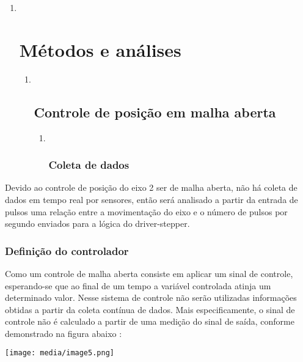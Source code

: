 \documentclass[]{article}
\begin{document}
\begin{enumerate}
\def\labelenumi{\arabic{enumi}.}
\item ~
  \section{Métodos e análises}\label{muxe9todos-e-anuxe1lises}

  \begin{enumerate}
  \def\labelenumii{\arabic{enumii}.}
  \item ~
    \subsection{Controle de posição em malha
    aberta}\label{controle-de-posiuxe7uxe3o-em-malha-aberta}

    \begin{enumerate}
    \def\labelenumiii{\arabic{enumiii}.}
    \item ~
      \subsubsection{Coleta de dados}\label{coleta-de-dados}
    \end{enumerate}
  \end{enumerate}
\end{enumerate}

Devido ao controle de posição do eixo 2 ser de malha aberta, não há
coleta de dados em tempo real por sensores, então será analisado a
partir da entrada de pulsos uma relação entre a movimentação do eixo e o
número de pulsos por segundo enviados para a lógica do driver-stepper.

\subsubsection{Definição do
controlador}\label{definiuxe7uxe3o-do-controlador}

Como um controle de malha aberta consiste em aplicar um sinal de
controle, esperando-se que ao final de um tempo a variável controlada
atinja um determinado valor. Nesse sistema de controle não serão
utilizadas informações obtidas a partir da coleta contínua de dados.
Mais especificamente, o sinal de controle não é calculado a partir de
uma medição do sinal de saída, conforme demonstrado na figura abaixo :

\texttt{[image: media/image5.png]}
\end{document}
